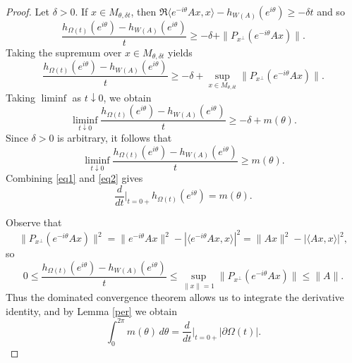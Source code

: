 \documentclass[10pt,a4paper]{amsart}
\begin{document}
\begin{proof}
Let $\delta>0$. If $x\in M_{\theta,\delta t}$, then $
\Re\langle e^{-i\theta}Ax,x\rangle-h_{W(A)}(e^{i\theta})\ge -\delta t$ and so
\[
\frac{h_{\Omega(t)}(e^{i\theta})-h_{W(A)}(e^{i\theta})}{t}
\ge
-\delta+\|P_{x^\perp}(e^{-i\theta}Ax)\|.
\]
Taking the supremum over $x\in M_{\theta,\delta t}$ yields
\[
\frac{h_{\Omega(t)}(e^{i\theta})-h_{W(A)}(e^{i\theta})}{t}
\ge
-\delta+
\sup_{x\in M_{\theta,\delta t}}
\|P_{x^\perp}(e^{-i\theta}Ax)\|.
\]
Taking $\liminf$ as $t\downarrow0$, we obtain
\[
\liminf_{t\downarrow0}
\frac{h_{\Omega(t)}(e^{i\theta})-h_{W(A)}(e^{i\theta})}{t}
\ge
-\delta+m(\theta).
\]
Since $\delta>0$ is arbitrary, it follows that
\begin{equation}\label{eq2}
    \liminf_{t\downarrow0}
\frac{h_{\Omega(t)}(e^{i\theta})-h_{W(A)}(e^{i\theta})}{t}
\ge
m(\theta).
\end{equation}
Combining \eqref{eq1} and \eqref{eq2} gives
\[
\frac{d}{dt}\bigg|_{t=0+} h_{\Omega(t)}(e^{i\theta})=m(\theta).
\]

Observe that
\[
\|P_{x^\perp}(e^{-i\theta}Ax)\|^2
=
\|e^{-i\theta}Ax\|^2-|\langle e^{-i\theta}Ax,x\rangle|^2
=
\|Ax\|^2-|\langle Ax,x\rangle|^2,
\]
so
\[
0\le
\frac{h_{\Omega(t)}(e^{i\theta})-h_{W(A)}(e^{i\theta})}{t}
\le
\sup_{\|x\|=1}\|P_{x^\perp}(e^{-i\theta}Ax)\|
\le \|A\|.
\]
Thus the dominated convergence theorem allows us to integrate the derivative identity,
and by Lemma \ref{per} we obtain
\[
\int_0^{2\pi} m(\theta)\,d\theta
=
\frac{d}{dt}\bigg|_{t=0+} |\partial\Omega(t)|.
\]
\end{proof}
\end{document}
